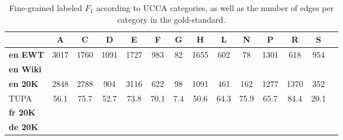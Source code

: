 \documentclass[11pt,a4paper]{article}
\begin{document}
%
%

%
%


\begin{table}[t]
\centering
\tiny
\setlength\tabcolsep{2pt}
\begin{tabular}{l|ccccccccccccc}
& A & C & D & E & F & G & H & L & N & P & R & S \\
\hline
\textbf{en EWT} & 3017 & 1760 & 1091 & 1727 & 983 & 82 & 1655 & 602 & 78 & 1301 & 618 & 954 \\
\hline
\textbf{en Wiki} &  \\
\hline
\textbf{en 20K} & 2848 & 2788 & 904 & 3116 & 622 & 98 & 1091 & 461 & 162 & 1277 & 1370 & 352 \\
TUPA & 56.1 & 75.7 & 52.7 & 73.8 & 70.1 & 7.4 & 50.6 & 64.3 & 75.9 & 65.7 & 84.4 & 20.1 \\
\hline
\textbf{fr 20K} & \\
\hline
\textbf{de 20K} & 
\end{tabular}
\caption{
Fine-grained labeled $F_1$ according to UCCA categories,
as well as the number of edges per category in the gold-standard.}
\label{tab:fine_grained_ucca}
\end{table}
\end{document}
